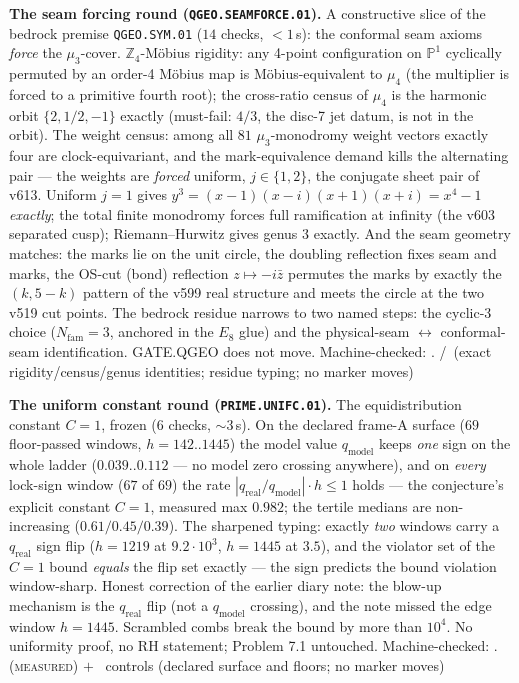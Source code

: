 \documentclass[11pt,a4paper]{article}
\theoremstyle{definition}
\begin{document}
\par\smallskip\noindent\textbf{The seam forcing round
(\texttt{QGEO.SEAMFORCE.01}).}
A constructive slice of the bedrock premise \texttt{QGEO.SYM.01}
($14$ checks, ${<}1$\,s): the conformal seam axioms \emph{force} the
$\mu_3$-cover.  $\mathbb{Z}_4$-M\"obius rigidity: any 4-point
configuration on $\mathbb{P}^1$ cyclically permuted by an order-4
M\"obius map is M\"obius-equivalent to $\mu_4$ (the multiplier is
forced to a primitive fourth root); the cross-ratio census of $\mu_4$
is the harmonic orbit $\{2,1/2,-1\}$ exactly (must-fail: $4/3$, the
disc-7 jet datum, is not in the orbit).  The weight census: among all
$81$ $\mu_3$-monodromy weight vectors exactly four are
clock-equivariant, and the mark-equivalence demand kills the
alternating pair --- the weights are \emph{forced} uniform,
$j\in\{1,2\}$, the conjugate sheet pair of v613.  Uniform $j=1$ gives
$y^3=(x-1)(x-i)(x+1)(x+i)=x^4-1$ \emph{exactly}; the total finite
monodromy forces full ramification at infinity (the v603 separated
cusp); Riemann--Hurwitz gives genus $3$ exactly.  And the seam
geometry matches: the marks lie on the unit circle, the doubling
reflection fixes seam and marks, the OS-cut (bond) reflection
$z\mapsto-i\bar z$ permutes the marks by exactly the $(k,5{-}k)$
pattern of the v599 real structure and meets the circle at the two
v519 cut points.  The bedrock residue narrows to two named steps: the
cyclic-3 choice ($N_{\mathrm{fam}}=3$, anchored in the $E_8$ glue)
and the physical-seam $\leftrightarrow$ conformal-seam
identification.  GATE.QGEO does not move.
Machine-checked: .
\mE/\mC\ (exact rigidity/census/genus identities; residue typing;
no marker moves)
\par\smallskip

\par\smallskip\noindent\textbf{The uniform constant round
(\texttt{PRIME.UNIFC.01}).}
The equidistribution constant $C=1$, frozen ($6$ checks,
${\sim}3$\,s).  On the declared frame-A surface ($69$ floor-passed
windows, $h=142..1445$) the model value $q_{\mathrm{model}}$ keeps
\emph{one} sign on the whole ladder ($0.039..0.112$ --- no model zero
crossing anywhere), and on \emph{every} lock-sign window ($67$ of
$69$) the rate $|q_{\mathrm{real}}/q_{\mathrm{model}}|\cdot h\le1$
holds --- the conjecture's explicit constant $C=1$, measured max
$0.982$; the tertile medians are non-increasing
($0.61/0.45/0.39$).  The sharpened typing: exactly \emph{two} windows
carry a $q_{\mathrm{real}}$ sign flip ($h=1219$ at $9.2\cdot10^3$,
$h=1445$ at $3.5$), and the violator set of the $C=1$ bound
\emph{equals} the flip set exactly --- the sign predicts the bound
violation window-sharp.  Honest correction of the earlier diary note:
the blow-up mechanism is the $q_{\mathrm{real}}$ flip (not a
$q_{\mathrm{model}}$ crossing), and the note missed the edge window
$h=1445$.  Scrambled combs break the bound by more than $10^4$.  No
uniformity proof, no RH statement; Problem 7.1 untouched.
Machine-checked: .
(\textsc{measured}) $+$ \mE\ controls (declared surface and floors;
no marker moves)
\par\smallskip
\end{document}
